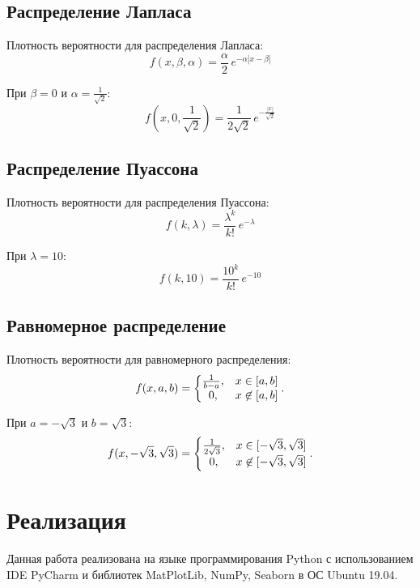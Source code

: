 \subsection{Распределение Лапласа}
Плотность вероятности для распределения Лапласа:
\begin{equation} 
f(x, \beta, \alpha) = \frac{\alpha}{2} \, e^{-\alpha|x - \beta|}
\end{equation}

При \( \beta = 0 \) и \( \alpha = \frac{1}{\sqrt{2}} \):
\begin{equation} 
f(x, 0, \frac{1}{\sqrt{2}}) = \frac{1}{2\sqrt{2}} \, e^{-\frac{|x|}{\sqrt{2}}}
\end{equation}


\subsection{Распределение Пуассона}

Плотность вероятности для распределения Пуассона:
\begin{equation} 
f(k, \lambda) = \frac{\lambda^k}{k!}\, e^{-\lambda}
\end{equation}

При \( \lambda = 10 \):
\begin{equation} 
f(k, 10) = \frac{10^k}{k!}\, e^{-10}
\end{equation}

\subsection{Равномерное распределение}
Плотность вероятности для равномерного распределения:
\begin{equation} 
f(x, a, b) = \left\{
\begin{matrix}
{1 \over b-a}, & x\in [a,b] \\
0, & x\not\in [a,b]
\end{matrix}
\right..
\end{equation}

При \( a = -\sqrt{3} \) и \( b = \sqrt{3} \):
\begin{equation} 
f(x, -\sqrt{3}, \sqrt{3}) = \left\{
\begin{matrix}
{1 \over 2\sqrt{3}}, & x\in [-\sqrt{3},\sqrt{3}] \\
0, & x\not\in [-\sqrt{3},\sqrt{3}]
\end{matrix}
\right..
\end{equation}


\section{Реализация}
Данная работа реализована на языке программирования Python с использованием IDE PyCharm и библиотек MatPlotLib, NumPy, Seaborn в ОС Ubuntu 19.04.

